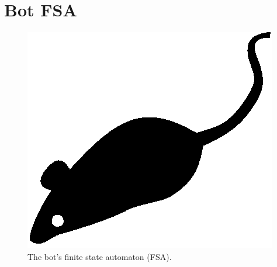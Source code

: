 \section{Bot FSA}
\label{sec:bot-fsa}

\lipsum[1]

\begin{figure}[tp]
  \centering
  \includegraphics{./fig/acmlarge-mouse}
  \caption{The bot's finite state automaton (FSA).}
    \label{fig:bot-fsa}
\end{figure}

\begin{description}
  \setlength\itemsep{1em}
  \item[INIT] \lipsum[1]
  \item[JOIN] \lipsum[1]
  \item[EXECUTION] \lipsum[1]
  \item[DEAD] \lipsum[1]
\end{description}

\lipsum[1]
